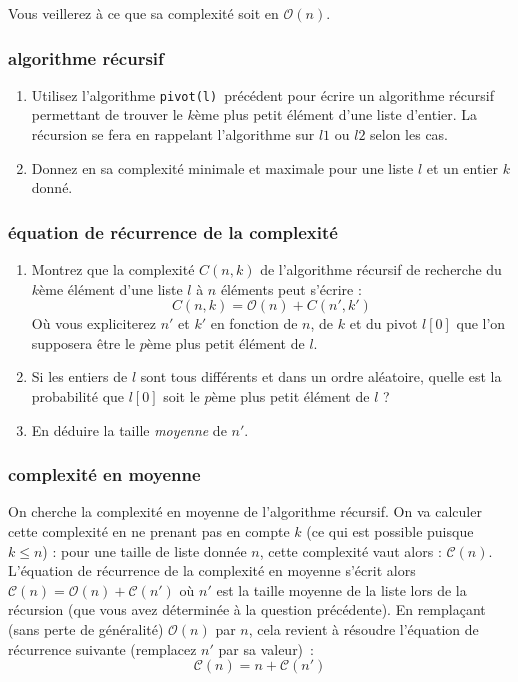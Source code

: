 \documentclass
[12pt]
{article}
\begin{document}
Vous veillerez à ce que sa complexité soit en $\mathcal{O}(n)$.

\subsubsection{algorithme récursif}

\begin{enumerate}
  \item Utilisez l'algorithme {\tt pivot(l)} précédent pour écrire un algorithme récursif permettant de trouver le $k$ème plus petit élément d'une liste d'entier. La récursion se fera en rappelant l'algorithme sur $l1$ ou $l2$ selon les cas.
  \item Donnez en sa complexité minimale et maximale pour une liste $l$ et un entier $k$ donné.
\end{enumerate}


\subsubsection{équation de récurrence de la complexité}

\begin{enumerate}
  \item Montrez que la complexité $C(n, k)$ de l'algorithme récursif de recherche du $k$ème élément d'une liste $l$ à $n$ éléments peut s'écrire :
  $$C(n, k) = \mathcal{O}(n) + C(n', k')$$
  Où vous expliciterez $n'$ et $k'$ en fonction de $n$, de $k$ et du pivot $l[0]$ que l'on supposera être le $p$ème plus petit élément de $l$.
  \item Si les entiers de $l$ sont tous différents et dans un ordre aléatoire, quelle est la probabilité que $l[0]$ soit le $p$ème plus petit élément de $l$ ?
  \item En déduire la taille {\em moyenne} de $n'$.
\end{enumerate}



\subsubsection{complexité en moyenne}

On cherche la complexité en moyenne de l'algorithme récursif. On va calculer cette complexité en ne prenant pas en compte $k$ (ce qui est possible puisque $k \leq n$) : pour une taille de liste donnée $n$, cette complexité vaut alors : $\mathcal{C}(n)$. L'équation de récurrence de la complexité en moyenne s'écrit alors $\mathcal{C}(n) = \mathcal{O}(n) + \mathcal{C}(n')$ où $n'$ est la taille moyenne de la liste lors de la récursion (que vous avez déterminée à la question précédente). En remplaçant (sans perte de généralité) $\mathcal{O}(n)$ par $n$, cela revient à résoudre l'équation de récurrence suivante (remplacez $n'$ par sa valeur)~:
$$\mathcal{C}(n) = n + \mathcal{C}(n')$$
\end{document}
